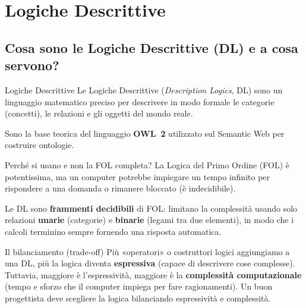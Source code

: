 \chapter{Logiche Descrittive}

\section{Cosa sono le Logiche Descrittive (DL) e a cosa servono?}

\begin{definition}{Logiche Descrittive}
    Le Logiche Descrittive (\emph{Description Logics}, DL) sono un linguaggio
    matematico preciso per descrivere in modo formale le categorie (concetti),
    le relazioni e gli oggetti del mondo reale.

    Sono la base teorica del linguaggio \textbf{OWL~2} utilizzato sul Semantic
    Web per costruire ontologie.
\end{definition}

\begin{observation}{Perché si usano e non la FOL completa?}
    La Logica del Primo Ordine (FOL) è potentissima, ma un computer potrebbe
    impiegare un tempo infinito per rispondere a una domanda o rimanere
    bloccato (è indecidibile).

    Le DL sono \textbf{frammenti decidibili} di FOL: limitano la complessità
    usando solo relazioni \textbf{unarie} (categorie) e \textbf{binarie}
    (legami tra due elementi), in modo che i calcoli terminino sempre
    fornendo una risposta automatica.
\end{observation}

\begin{observation}{Il bilanciamento (trade-off)}
    Più «operatori» o costruttori logici aggiungiamo a una DL, più la logica
    diventa \textbf{espressiva} (capace di descrivere cose complesse).
    Tuttavia, maggiore è l'espressività, maggiore è la \textbf{complessità
    computazionale} (tempo e sforzo che il computer impiega per fare
    ragionamenti). Un buon progettista deve scegliere la logica bilanciando
    espressività e complessità.
\end{observation}

